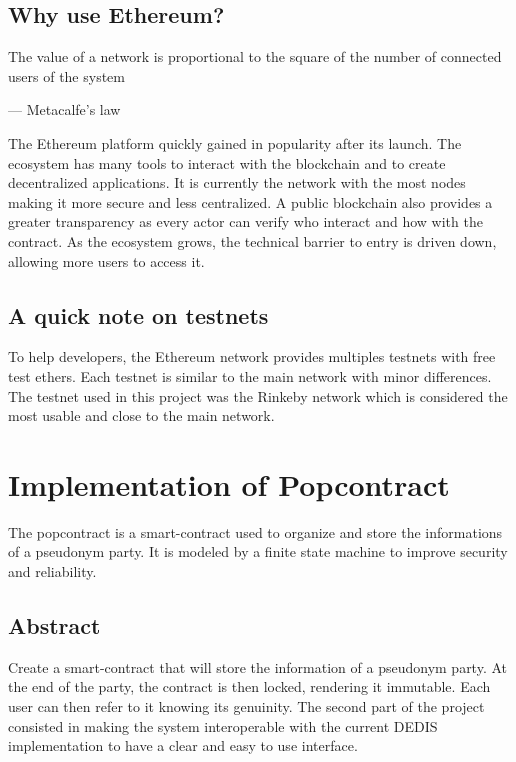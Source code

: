 \documentclass[11pt, a4paper, twoside, openright]{book} %
\begin{document}
\subsection{Why use Ethereum?}

\epigraph{The value of a network is proportional to the square of the number of connected users of the system}
{--- \textup{Metacalfe's law}}

The Ethereum platform quickly gained in popularity after its launch. The ecosystem has many tools to interact with the blockchain and to create decentralized applications. It is currently the network with the most nodes making it more secure and less centralized. A public blockchain also provides a greater transparency as every actor can verify who interact and how with the contract. As the ecosystem grows, the technical barrier to entry is driven down, allowing more users
to access it.

\subsection{A quick note on testnets}
To help developers, the Ethereum network provides multiples testnets with free test ethers. Each testnet is similar to the main network with minor differences. The testnet used in this project was the Rinkeby network which is considered the most usable and close to the main network.


\newpage



\section{Implementation of Popcontract}
The popcontract is a smart-contract used to organize and store the informations of a pseudonym party. It is modeled by a finite state machine to improve security and reliability.
\subsection{Abstract}
Create a smart-contract that will store the information of a pseudonym party. At the end of the party, the contract is then locked, rendering it immutable. Each user can then refer to it knowing its genuinity.
The second part of the project consisted in making the system interoperable with the current DEDIS implementation to have a clear and easy to use interface.
\end{document}
